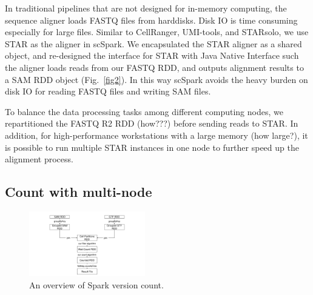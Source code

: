 \documentclass[conference]{IEEEtran}
\begin{document}
In traditional pipelines that are not designed for in-memory computing, the sequence aligner loads FASTQ files from harddisks. 
Disk IO is time consuming especially for large files. 
Similar to CellRanger, UMI-tools, and STARsolo, we use STAR as the aligner in scSpark. 
We encapsulated the STAR aligner as a shared object, and re-designed the interface for STAR with Java Native Interface such the aligner loads reads from our FASTQ RDD, and outputs alignment results to a SAM RDD object (Fig.~\ref{fig2}). 
In this way scSpark avoids the heavy burden on disk IO for reading FASTQ files and writing SAM files. 

To balance the data processing tasks among different computing nodes, we repartitioned the FASTQ R2 RDD (how???) before sending reads to STAR. 
In addition, for high-performance workstations with a large memory (how large?), it is possible to run multiple STAR instances in one node to further speed up the alignment process. 

\subsection{Count with multi-node}
\begin{figure}
	\includegraphics[width=0.45\textwidth]{Fig3.pdf}
	\caption{An overview of Spark version count.} \label{fig3}
\end{figure}
\end{document}
